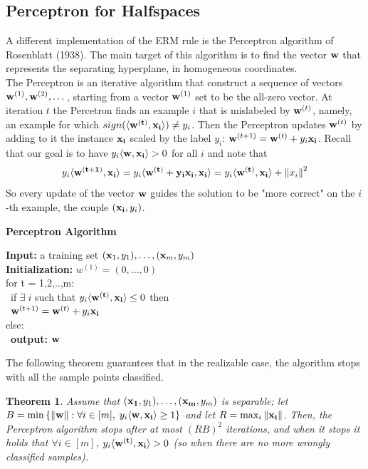 \documentclass[12pt]{report}
\theoremstyle{plain}
\newtheorem{THEO}{Theorem}
\newcommand\sprod[2]{\langle \vb{#1},\vb{#2}\rangle}
\begin{document}
\begin{flushleft}
\subsection{Perceptron for Halfspaces}
A different implementation of the ERM rule is the Perceptron algorithm of 
Rosenblatt (1938). The main target of this algorithm is to find the vector 
$\vb{w}$ that represents the separating hyperplane, in homogeneous 
coordinates.\\
The Perceptron is an iterative algorithm that construct a sequence of vectors 
$\vb{w}^{(1)},\vb{w}^{(2)},\dots$, starting from a vector $\vb{w}^{(1)}$ set to 
be the all-zero vector. At iteration $t$ the Percetron finds an example $i$ 
that is mislabeled by $\vb{w}^{(t)}$, namely, an example for which 
$sign(\sprod{w^{(t)}}{x_i})\neq y_i$. Then the Perceptron updates 
$\vb{w}^{(t)}$ by adding to it the instance $\vb{x_i}$ scaled by the label 
$y_i$: $\vb{w}^{(t+1)}=\vb{w}^{(t)}+y_i\vb{x_i}$. Recall that our goal is to 
have $y_i\sprod{w}{x_i}>0$ for all $i$ and note that
\[ y_i\sprod{w^{(t+1)}} {x_i} = y_i\sprod{w^{(t)}+y_i\vb{x_i}}{x_i} = 
y_i\sprod{w^{(t)}}{x_i}+\norm{x_i}^2 \]
So every update of the vector $\vb{w}$ guides the solution to be "more correct" 
on the $i$-th example, the couple $(\vb{x_i},y_i)$.

\begin{tcolorbox}
	\begin{center}
		\textbf{Perceptron Algorithm}
	\end{center}
	\textbf{Input:} a training set $(\vb{x}_1,y_1),\dots,(\vb{x}_m,y_m)$\\
	\textbf{Initialization:} $w^{(1)} = (0,...,0)$\\
	
	for t = 1,2,..,m:\\
	\-\ \quad	if $\exists\;i $ such that $y_i\sprod{w^{(t)}}{x_i}\leq 0$ 
	then\\
	\-\ \quad	$\vb{w}^{(t+1)}=\vb{w}^{(t)}+y_i\vb{x_i}$\\
		else:\\
	\-\ \quad	\textbf{output:} $\vb{w}$ 	
\end{tcolorbox}

The following theorem guarantees that in the realizable case, the algorithm 
stops with all the sample points classified.
\begin{THEO}
	Assume that $(\vb{x_1},y_1),\dots,(\vb{x_m},y_m)$ is separable; let 
	$B=\min\left\{\norm{\vb{w}}:\forall i\in [m],\; y_i\sprod{w}{x_i}\geq 1 
	\right\}$ and let $R=\max_i \norm{\vb{x_i}}$. Then, the Perceptron 
	algorithm stops after at most $(RB)^2$ iterations, and when it stops it 
	holds that $\forall i\in [m]$, $y_i\sprod{\vb{w}^{(t)}}{x_i}>0$ (so when 
	there are no more wrongly classified samples).
\end{THEO}


\end{flushleft}
\end{document}
